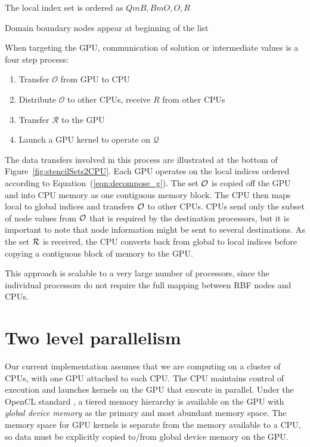 \documentclass{report}
\begin{document}
\authnote{} The local index set is ordered as ${QmB, BmO, O, R}$ 

\authnote{} Domain boundary nodes appear at beginning of the list 


When targeting the GPU, communication of solution or intermediate values is a four step process:
        \begin{enumerate}
    \item Transfer $\mathcal{O}$ from GPU to CPU
	\item Distribute $\mathcal{O}$ to other CPUs, receive $R$ from other CPUs
	\item Transfer $\mathcal{R}$ to the GPU
	\item Launch a GPU kernel to operate on $\mathcal{Q}$
     \end{enumerate} 
The data transfers involved in this process are illustrated at the bottom of Figure~\ref{fig:stencilSets2CPU}.
    Each GPU operates on the local indices ordered 
according to Equation~(\ref{eqn:decompose_g}). The set 
$\mathcal{O}$ is copied off the GPU and into CPU memory as one contiguous memory block. The CPU then maps local to global indices and transfers $\mathcal{O}$ to other CPUs. CPUs send only the subset of node values from $\mathcal{O}$ that is required by the destination processors, but it is important to note that node information might be sent to several destinations. 
As the set $\mathcal{R}$ is received, the CPU converts back from global to local indices before copying a contiguous block of memory to the GPU. 

        This approach is scalable to a very large number of 
		processors, since the individual processors do not require the 
		full mapping between RBF nodes and CPUs. 



\section{Two level parallelism}

Our current implementation assumes that we are computing on a cluster of CPUs,
with one GPU attached to each CPU. The CPU maintains control of execution and
launches kernels on the GPU that execute in parallel. Under the OpenCL standard
\cite{OpenCL2009}, a tiered memory hierarchy is available on the GPU with
\textit{global device memory} as the primary and most abundant memory space.
The memory space for GPU kernels is separate from the memory available to a
CPU, so data must be explicitly copied to/from global device memory on the GPU. 
\end{document}
